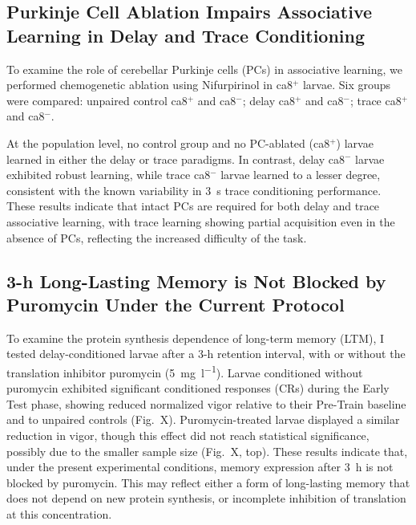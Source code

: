 

\subsection*{Purkinje Cell Ablation Impairs Associative Learning in Delay and Trace Conditioning}

To examine the role of cerebellar Purkinje cells (PCs) in associative learning, we performed chemogenetic ablation using Nifurpirinol in ca8$^+$ larvae. Six groups were compared: unpaired control ca8$^+$ and ca8$^-$; delay ca8$^+$ and ca8$^-$; trace ca8$^+$ and ca8$^-$.

At the population level, no control group and no PC-ablated (ca8$^+$) larvae learned in either the delay or trace paradigms. In contrast, delay ca8$^-$ larvae exhibited robust learning, while trace ca8$^-$ larvae learned to a lesser degree, consistent with the known variability in 3~s trace conditioning performance. These results indicate that intact PCs are required for both delay and trace associative learning, with trace learning showing partial acquisition even in the absence of PCs, reflecting the increased difficulty of the task.





\subsection{3-h Long-Lasting Memory is Not Blocked by Puromycin Under the Current Protocol}

To examine the protein synthesis dependence of long-term memory (LTM), I tested delay-conditioned larvae after a 3-h retention interval, with or without the translation inhibitor puromycin (\SI{5}{\milli\gram\per\litre}). Larvae conditioned without puromycin exhibited significant conditioned responses (CRs) during the Early Test phase, showing reduced normalized vigor relative to their Pre-Train baseline and to unpaired controls (Fig.~X). Puromycin-treated larvae displayed a similar reduction in vigor, though this effect did not reach statistical significance, possibly due to the smaller sample size (Fig.~X, top). These results indicate that, under the present experimental conditions, memory expression after 3~h is not blocked by puromycin. This may reflect either a form of long-lasting memory that does not depend on new protein synthesis, or incomplete inhibition of translation at this concentration.

